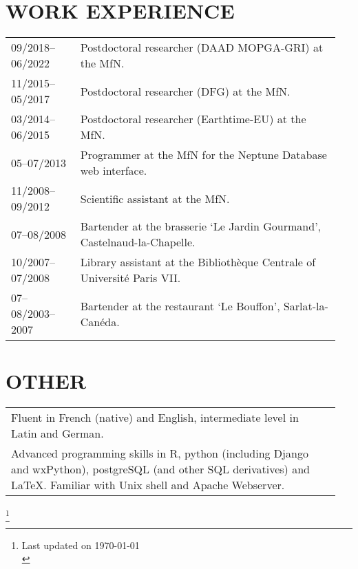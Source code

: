 \documentclass[11pt, a4paper]{article}
\begin{document}
\section{WORK EXPERIENCE}
\begin{longtable}{@{}p{0.2\linewidth} P{0.75\linewidth}@{}}
09/2018--06/2022 & Postdoctoral researcher (DAAD MOPGA-GRI) at the MfN.\\
11/2015--05/2017 & Postdoctoral researcher (DFG) at the MfN.\\
03/2014--06/2015 & Postdoctoral researcher (Earthtime-EU) at the MfN.\\
05--07/2013 & Programmer at the MfN for the Neptune Database web interface.\\
11/2008--09/2012 & Scientific assistant at the MfN.\\
07--08/2008 & Bartender at the brasserie `Le Jardin Gourmand', Castelnaud-la-Chapelle.\\
10/2007--07/2008 & Library assistant at the Biblioth\`{e}que Centrale of Universit\'{e} Paris VII.\\
07--08/2003--2007 & Bartender at the restaurant `Le Bouffon', Sarlat-la-Can\'{e}da.\\
\end{longtable}

\section{OTHER}
\begin{longtable}{@{}p{0.94\linewidth} p{0.01\linewidth}@{}}
Fluent in French (native) and English, intermediate level in Latin and German. & \\
Advanced programming skills in R, python (including Django and wxPython), postgreSQL (and other SQL derivatives) and \LaTeX. Familiar with Unix shell and Apache Webserver. & \\
\end{longtable}

\vfill

{\let\thefootnote\relax\footnote{Last updated on \today\\
\theendnotes}}
\end{document}
